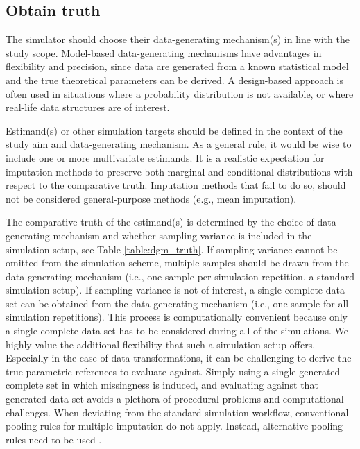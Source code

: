 \documentclass[bimj,fleqn]{w-art}
\begin{document}

\subsection{Obtain truth}


The simulator should choose their data-generating mechanism(s) in line with the study scope. Model-based data-generating mechanisms have advantages in flexibility and precision, since data are generated from a known statistical model and the true theoretical parameters can be derived. A design-based approach is often used in situations where a probability distribution is not available, or where real-life data structures are of interest.  

Estimand(s) or other simulation targets should be defined in the context of the study aim and data-generating mechanism. As a general rule, it would be wise to include one or more multivariate estimands. It is a realistic expectation for imputation methods to preserve both marginal and conditional distributions with respect to the comparative truth. Imputation methods that fail to do so, should not be considered general-purpose methods (e.g., mean imputation).

The comparative truth of the estimand(s) is determined by the choice of data-generating mechanism and whether sampling variance is included in the simulation setup, see Table \ref{table:dgm_truth}. If sampling variance cannot be omitted from the simulation scheme, multiple samples should be drawn from the data-generating mechanism (i.e., one sample per simulation repetition, a standard simulation setup). If sampling variance is not of interest, a single complete data set can be obtained from the data-generating mechanism (i.e., one sample for all simulation repetitions). This process is computationally convenient because only a single complete data set has to be considered during all of the simulations. We highly value the additional flexibility that such a simulation setup offers. Especially in the case of data transformations, it can be challenging to derive the true parametric references to evaluate against. Simply using a single generated complete set in which missingness is induced, and evaluating against that generated data set avoids a plethora of procedural problems and computational challenges.
When deviating from the standard simulation workflow, conventional pooling rules for multiple imputation \citep[cf.][p. 76-77]{rubi87} do not apply. Instead, alternative pooling rules need to be used \citep{raghunathan2003multiple,vink14}.
\end{document}
